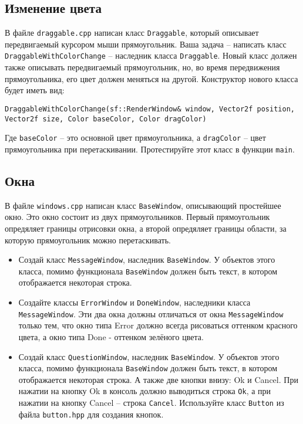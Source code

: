 \documentclass{article}
\begin{document}
\subsection{Изменение цвета}
В файле \texttt{draggable.cpp} написан класс \texttt{Draggable}, который описывает передвигаемый курсором мыши прямоугольник. Ваша задача -- написать класс \texttt{DraggableWithColorChange} -- наследник класса \texttt{Draggable}. Новый класс должен также описывать передвигаемый прямоугольник, но, во время передвижения прямоугольника, его цвет должен меняться на другой. Конструктор нового класса будет иметь вид:
\begin{lstlisting}
DraggableWithColorChange(sf::RenderWindow& window, Vector2f position, Vector2f size, Color baseColor, Color dragColor) 
\end{lstlisting}
Где \texttt{baseColor} -- это основной цвет прямоугольника, а \texttt{dragColor} -- цвет прямоугольника при перетаскивании.
Протестируйте этот класс в функции \texttt{main}.




\subsection{Окна}
В файле \texttt{windows.cpp} написан класс \texttt{BaseWindow}, описывающий простейшее окно. Это окно состоит из двух прямоугольников. Первый прямоугольник опредяляет границы отрисовки окна, а второй опредяляет границы области, за которую прямоугольник можно перетаскивать.

\begin{itemize}

\item Создай класс \texttt{MessageWindow}, наследник \texttt{BaseWindow}.
У объектов этого класса, помимо функционала \texttt{BaseWindow} должен быть текст, в котором отображается некоторая строка. 

\item Создайте классы \texttt{ErrorWindow} и \texttt{DoneWindow}, наследники класса \texttt{MessageWindow}. Эти два окна должны отличаться от окна \texttt{MessageWindow} только тем, что окно типа Error должно всегда рисоваться оттенком красного цвета, а окно типа Done - оттенком зелёного цвета.

\item Создай класс \texttt{QuestionWindow}, наследник \texttt{BaseWindow}.
У объектов этого класса, помимо функционала \texttt{BaseWindow} должен быть текст, в котором отображается некоторая строка. А также две кнопки внизу: Ok и Cancel. При нажатии на кнопку Ok в консоль должно выводиться строка \texttt{Ok}, а при нажатии на кнопку Cancel -- строка \texttt{Cancel}. Используйте класс \texttt{Button} из файла \texttt{button.hpp} для создания кнопок.

\end{itemize}


        
\end{document}

